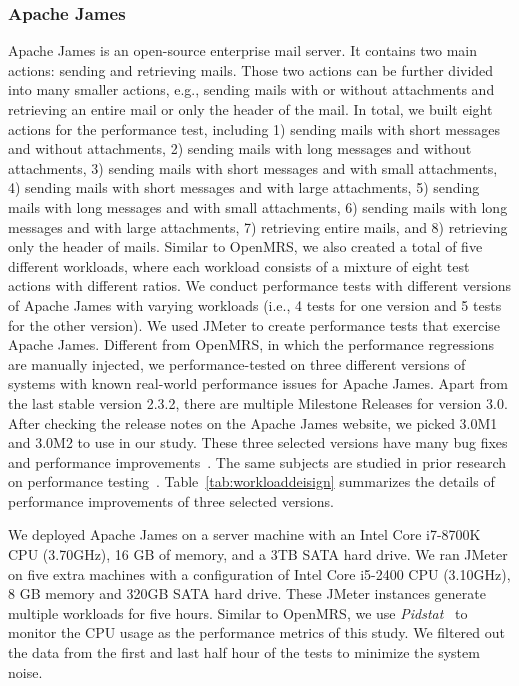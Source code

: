 \subsubsection{Apache James}
Apache James is an open-source enterprise mail server. It contains two main actions: sending and retrieving mails. Those two actions can be further divided into many smaller actions, e.g., sending mails with or without attachments and retrieving an entire mail or only the header of the mail. In total, we built eight actions for the performance test, including 1) sending mails with short messages and without attachments, 2) sending mails with long messages and without attachments, 3) sending mails with short messages and with small attachments, 4) sending mails with short messages and with large attachments, 5) sending mails with long messages and with small attachments, 6) sending mails with long messages and with large attachments, 7) retrieving entire mails, and 8) retrieving only the header of mails.
Similar to OpenMRS, we also created a total of five different workloads, where each workload consists of a mixture of eight test actions with different ratios. 
We conduct performance tests with different versions of Apache James with varying workloads (i.e., 4 tests for one version and 5 tests for the other version). We used JMeter to create performance tests that exercise Apache James.
Different from OpenMRS, in which the performance regressions are manually injected, we performance-tested on three different versions of systems with known real-world performance issues for Apache James. Apart from the last stable version 2.3.2, there are multiple Milestone Releases for version 3.0. After checking the release notes on the Apache James website, we picked 3.0M1 and 3.0M2 to use in our study. These three selected versions have many bug fixes and performance improvements~\citep{Apache-James}. The same subjects are studied in prior research on performance testing~\citep{DBLP:conf/icst/GaoJBL16}. Table~\ref{tab:workloaddeisign} summarizes the details of performance improvements of three selected versions. 

We deployed Apache James on a server machine with an Intel Core i7-8700K CPU (3.70GHz), 16 GB of memory, and a 3TB SATA hard drive. We ran JMeter on five extra machines with a configuration of Intel Core i5-2400 CPU (3.10GHz), 8 GB memory and 320GB SATA hard drive. These JMeter instances generate multiple workloads for five hours. Similar to OpenMRS, we use \emph{Pidstat}~\citep{pidstat} to monitor the CPU usage as the performance metrics of this study. We filtered out the data from the first and last half hour of the tests to minimize the system noise.

